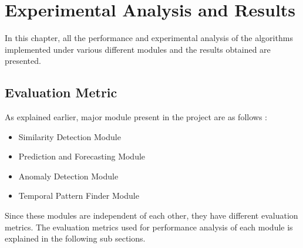 \documentclass[12pt,a4paper]{report}
\begin{document}
\chapter{Experimental Analysis and Results}
In this chapter, all the performance and experimental analysis of the algorithms implemented under various different modules and the results obtained are presented.
\section{Evaluation Metric}
As explained earlier, major module present in the project are as follows :
\begin{itemize}
\item Similarity Detection Module
\item Prediction and Forecasting Module
\item Anomaly Detection Module
\item Temporal Pattern Finder Module
\end{itemize}

Since these modules are independent of each other, they have different evaluation metrics. The evaluation metrics used for performance analysis of each module is explained in the following sub sections.
\end{document}
